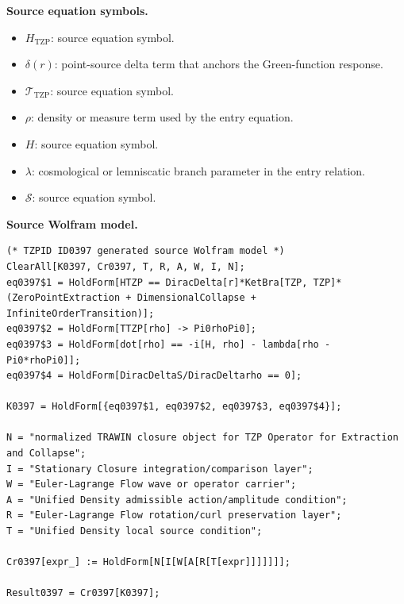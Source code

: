 \begin{minipage}[t]{0.49\linewidth}
\begingroup
\small
\raggedright
\textbf{Source equation symbols.}\par
\begin{itemize}[leftmargin=1.35em,itemsep=1pt,topsep=1pt,parsep=0pt]
    \item $H_{\mathrm{TZP}}$: source equation symbol.
    \item $\delta(r)$: point-source delta term that anchors the Green-function response.
    \item $\mathcal{T}_{\mathrm{TZP}}$: source equation symbol.
    \item $\rho$: density or measure term used by the entry equation.
    \item $H$: source equation symbol.
    \item $\lambda$: cosmological or lemniscatic branch parameter in the entry relation.
    \item $\mathcal{S}$: source equation symbol.
\end{itemize}
\endgroup
\end{minipage}\hfill
\begin{minipage}[t]{0.47\linewidth}
\begingroup
\scriptsize
\raggedright
\textbf{Source Wolfram model.}\par
\begin{Verbatim}[fontsize=\tiny,breaklines=true,breakanywhere=true]
(* TZPID ID0397 generated source Wolfram model *)
ClearAll[K0397, Cr0397, T, R, A, W, I, N];
eq0397$1 = HoldForm[HTZP == DiracDelta[r]*KetBra[TZP, TZP]*(ZeroPointExtraction + DimensionalCollapse + InfiniteOrderTransition)];
eq0397$2 = HoldForm[TTZP[rho] -> Pi0rhoPi0];
eq0397$3 = HoldForm[dot[rho] == -i[H, rho] - lambda[rho - Pi0*rhoPi0]];
eq0397$4 = HoldForm[DiracDeltaS/DiracDeltarho == 0];

K0397 = HoldForm[{eq0397$1, eq0397$2, eq0397$3, eq0397$4}];

N = "normalized TRAWIN closure object for TZP Operator for Extraction and Collapse";
I = "Stationary Closure integration/comparison layer";
W = "Euler-Lagrange Flow wave or operator carrier";
A = "Unified Density admissible action/amplitude condition";
R = "Euler-Lagrange Flow rotation/curl preservation layer";
T = "Unified Density local source condition";

Cr0397[expr_] := HoldForm[N[I[W[A[R[T[expr]]]]]]];

Result0397 = Cr0397[K0397];
\end{Verbatim}
\endgroup
\end{minipage}


